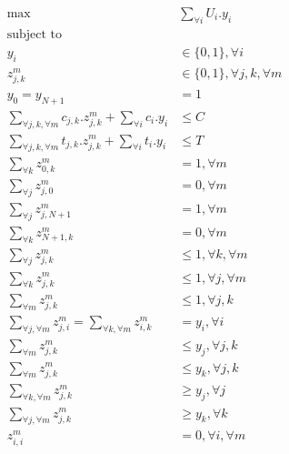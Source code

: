 \begin{align}
		\label{eq:max}
	\max & \sum_{\forall i} U_{{i}} . y_{i} \\
	\text{subject to } & \nonumber \\
		\label{eq:y}
	y_{i} & \in \{ 0, 1 \}, \forall i \\
		\label{eq:z}
	z^m_{j,k} & \in \{ 0, 1 \}, \forall j,k, \forall m \\
		\label{eq:sd}
	y_{0} = y_{{N+1}} & = 1 \\
		\label{eq:cost}
	\sum_{\forall j, k, \forall m} c_{{j},{k}} . z^m_{j,k} + \sum_{\forall i} c_{i} . y_{i} & \leq C \\
		\label{eq:time}
	\sum_{\forall j, k, \forall m} t_{{j},{k}} . z^m_{j,k} + \sum_{\forall i} t_{i} . y_{i} & \leq T \\
		\label{eq:sout}
	\sum_{\forall k} z^m_{{0},{k}} & = 1, \forall m \\
		\label{eq:sin}
	\sum_{\forall j} z^m_{{j},{0}} & = 0, \forall m \\
		\label{eq:din}
	\sum_{\forall j} z^m_{{j},{N+1}} & = 1, \forall m \\
		\label{eq:dout}
	\sum_{\forall k} z^m_{{N+1},{k}} & = 0, \forall m \\
		\label{eq:out}
	\sum_{\forall j} z^m_{{j},{k}} & \leq 1, \forall k, \forall m \\
		\label{eq:in}
	\sum_{\forall k} z^m_{{j},{k}} & \leq 1, \forall j, \forall m \\
		\label{eq:mode}
	\sum_{\forall m} z^m_{{j},{k}} & \leq 1, \forall j, k \\
		\label{eq:connectivity}
	\sum_{\forall j, \forall m} z^m_{{j},{i}} = \sum_{\forall k, \forall m} z^m_{{i},{k}} & = y_i, \forall i \\
		\label{eq:nodechosen1}
	\sum_{\forall m} z^m_{{j},{k}} & \leq y_j, \forall j,k \\
		\label{eq:nodechosen2}
	\sum_{\forall m} z^m_{{j},{k}} & \leq y_k, \forall j,k \\
		\label{eq:edgechosen1}
	\sum_{\forall k, \forall m} z^m_{{j},{k}} & \geq y_j, \forall j \\
		\label{eq:edgechosen2}
	\sum_{\forall j, \forall m} z^m_{{j},{k}} & \geq y_k, \forall k \\
		\label{eq:self}
	z^m_{{i},{i}} & = 0, \forall i, \forall m 
\end{align}


